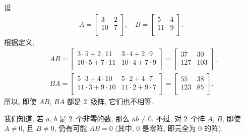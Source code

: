 \documentclass[../libro.tex]{subfiles}
\begin{document}
\begin{example}
    设
    \begin{align*}
        A =
        \begin{bmatrix}
            3  & 2 \\
            10 & 7 \\
        \end{bmatrix},
        \quad
        B =
        \begin{bmatrix}
            5  & 4 \\
            11 & 9 \\
        \end{bmatrix}.
    \end{align*}
    根据定义,
    \begin{align*}
        &
        AB =
        \begin{bmatrix}
            3 \cdot 5 + 2 \cdot 11  & 3 \cdot 4 + 2 \cdot 9  \\
            10 \cdot 5 + 7 \cdot 11 & 10 \cdot 4 + 7 \cdot 9 \\
        \end{bmatrix}
        =
        \begin{bmatrix}
            37  & 30  \\
            127 & 103 \\
        \end{bmatrix},
        \\
        &
        BA =
        \begin{bmatrix}
            5 \cdot 3 + 4 \cdot 10  & 5 \cdot 2 + 4 \cdot 7  \\
            11 \cdot 3 + 9 \cdot 10 & 11 \cdot 2 + 9 \cdot 7 \\
        \end{bmatrix}
        =
        \begin{bmatrix}
            55  & 38 \\
            123 & 85 \\
        \end{bmatrix}.
    \end{align*}
    所以, 即使 \(AB\), \(BA\) 都是 \(2\)~级阵,
    它们也不相等.
\end{example}

我们知道, 若 \(a\), \(b\) 是 \(2\)~个非零的数,
那么 \(ab \neq 0\).
不过, 对 \(2\)~个阵 \(A\), \(B\),
即使 \(A \neq 0\), 且 \(B \neq 0\),
仍有可能 \(AB = 0\)
(其中, \(0\) 是零阵,
即元全为 \(0\) 的阵).
\end{document}
